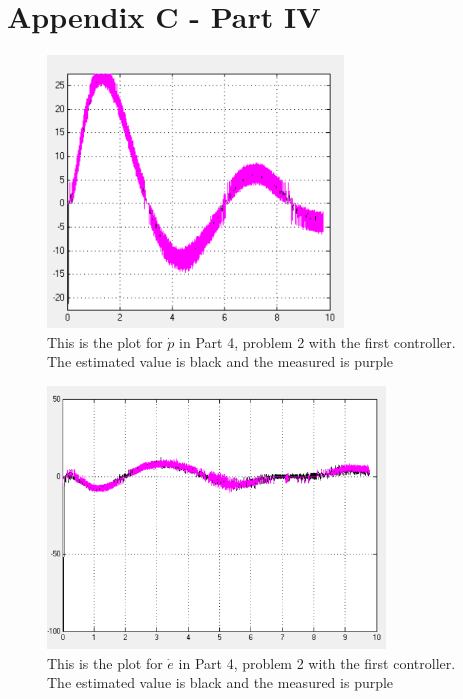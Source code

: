\section{Appendix C - Part IV}

\begin{figure}[H]
    \centering
    \includegraphics[width=0.7\textwidth]{figures/P4p21_e_dot}
    \caption{This is the plot for $\dot{p}$ in Part 4, problem 2 with the first controller. The estimated value is black and the measured is purple}
    \label{fig:P4p21_e_dot}
\end{figure}

\begin{figure}[H]
    \centering
    \includegraphics[width=0.8\textwidth]{figures/P4p21_p_dot}
    \caption{This is the plot for $\dot{e}$ in Part 4, problem 2 with the first controller. The estimated value is black and the measured is purple}
    \label{fig:P4p21_p_dot}
\end{figure}

